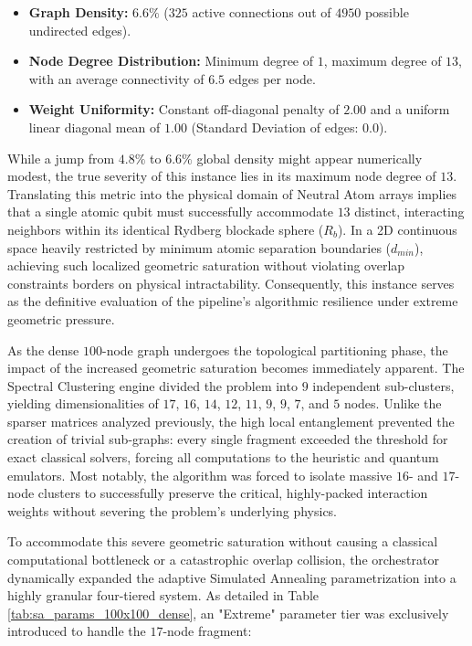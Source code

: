 \begin{itemize}
    \item \textbf{Graph Density:} $6.6\%$ ($325$ active connections out of $4950$ possible undirected edges).
    \item \textbf{Node Degree Distribution:} Minimum degree of $1$, maximum degree of $13$, with an average connectivity of $6.5$ edges per node.
    \item \textbf{Weight Uniformity:} Constant off-diagonal penalty of $2.00$ and a uniform linear diagonal mean of $1.00$ (Standard Deviation of edges: $0.0$).
\end{itemize}

While a jump from $4.8\%$ to $6.6\%$ global density might appear numerically modest, the true severity of this instance lies in its maximum node degree of $13$. Translating this metric into the physical domain of Neutral Atom arrays implies that a single atomic qubit must successfully accommodate $13$ distinct, interacting neighbors within its identical Rydberg blockade sphere ($R_b$). In a 2D continuous space heavily restricted by minimum atomic separation boundaries ($d_{min}$), achieving such localized geometric saturation without violating overlap constraints borders on physical intractability. Consequently, this instance serves as the definitive evaluation of the pipeline's algorithmic resilience under extreme geometric pressure.

As the dense $100$-node graph undergoes the topological partitioning phase, the impact of the increased geometric saturation becomes immediately apparent. The Spectral Clustering engine divided the problem into $9$ independent sub-clusters, yielding dimensionalities of $17$, $16$, $14$, $12$, $11$, $9$, $9$, $7$, and $5$ nodes. Unlike the sparser matrices analyzed previously, the high local entanglement prevented the creation of trivial sub-graphs: every single fragment exceeded the threshold for exact classical solvers, forcing all computations to the heuristic and quantum emulators. Most notably, the algorithm was forced to isolate massive $16$- and $17$-node clusters to successfully preserve the critical, highly-packed interaction weights without severing the problem's underlying physics.

To accommodate this severe geometric saturation without causing a classical computational bottleneck or a catastrophic overlap collision, the orchestrator dynamically expanded the adaptive Simulated Annealing parametrization into a highly granular four-tiered system. As detailed in Table \ref{tab:sa_params_100x100_dense}, an "Extreme" parameter tier was exclusively introduced to handle the $17$-node fragment:

